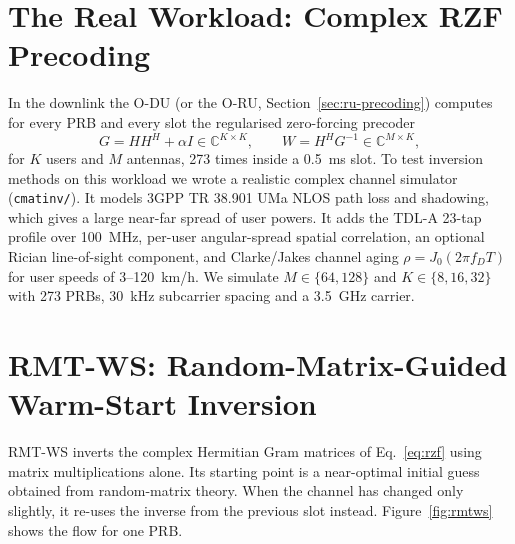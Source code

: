 \section{The Real Workload: Complex RZF Precoding}
\label{sec:rzf}

In the downlink the O-DU (or the O-RU, Section~\ref{sec:ru-precoding}) computes for every PRB and every slot the regularised zero-forcing precoder
\begin{equation}
  G = HH^H + \alpha I \in \mathbb{C}^{K\times K}, \qquad W = H^H G^{-1} \in \mathbb{C}^{M\times K},
  \label{eq:rzf}
\end{equation}
for $K$ users and $M$ antennas, 273 times inside a 0.5~ms slot. To test inversion methods on this workload we wrote a realistic complex channel simulator (\texttt{cmatinv/}). It models 3GPP TR 38.901 UMa NLOS path loss and shadowing, which gives a large near-far spread of user powers. It adds the TDL-A 23-tap profile over 100~MHz, per-user angular-spread spatial correlation, an optional Rician line-of-sight component, and Clarke/Jakes channel aging $\rho = J_0(2\pi f_D T)$ for user speeds of 3--120~km/h. We simulate $M \in \{64, 128\}$ and $K \in \{8, 16, 32\}$ with 273 PRBs, 30~kHz subcarrier spacing and a 3.5~GHz carrier.

\section{RMT-WS: Random-Matrix-Guided Warm-Start Inversion}
\label{sec:rmtws}

RMT-WS inverts the complex Hermitian Gram matrices of Eq.~\eqref{eq:rzf} using matrix multiplications alone. Its starting point is a near-optimal initial guess obtained from random-matrix theory. When the channel has changed only slightly, it re-uses the inverse from the previous slot instead. Figure~\ref{fig:rmtws} shows the flow for one PRB.

